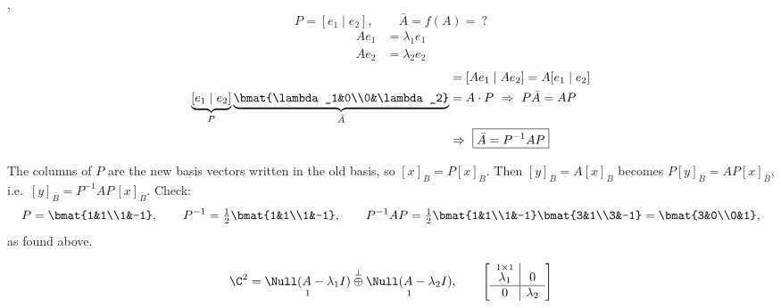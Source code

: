 \sep
\[
P=[e_1\mid e_2],\qquad \bar{A}=f(A)=\ ?
\]
\[
\begin{aligned}Ae_1&=\lambda_1e_1\\Ae_2&=\lambda_2e_2\end{aligned}
\]
\begin{align*}
[\lambda_1e_1\mid\lambda_2e_2]&=[Ae_1\mid Ae_2]=A[e_1\mid e_2]\\
\underbrace{[e_1\mid e_2]}_{P}\underbrace{\bmat{\lambda_1&0\\0&\lambda_2}}_{\bar{A}}&=A\cdot P
\ \Rightarrow\ P\bar{A}=AP\\
&\Rightarrow\ \boxed{\bar{A}=P^{-1}AP}
\end{align*}
\begin{insight}
The columns of $P$ are the new basis vectors written in the old basis, so $[x]_B=P[x]_{\bar B}$. Then $[y]_B=A[x]_B$ becomes $P[y]_{\bar B}=AP[x]_{\bar B}$, i.e.\ $[y]_{\bar B}=P^{-1}AP\,[x]_{\bar B}$. Check:
\[
P=\bmat{1&1\\1&-1},\qquad P^{-1}=\tfrac12\bmat{1&1\\1&-1},\qquad
P^{-1}AP=\tfrac12\bmat{1&1\\1&-1}\bmat{3&1\\3&-1}=\bmat{3&0\\0&1},
\]
as found above.
\end{insight}
\[
\C^2=\underset{1}{\Null(A-\lambda_1I)}\overset{\perp}{\oplus}\underset{1}{\Null(A-\lambda_2I)},
\qquad
\left[\begin{array}{c|c}\overset{1\times1}{\lambda_1}&0\\\hline 0&\lambda_2\end{array}\right]
\]

